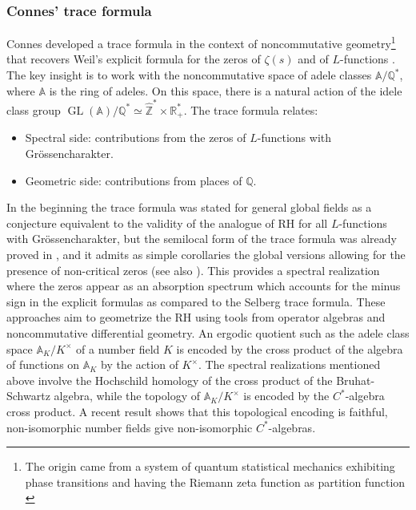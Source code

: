 \documentclass{article}
\def\A{{\mathbb A}}
\def\Q{{\mathbb Q}}
\def\R{{\mathbb R}}
\def\Z{{\mathbb Z}}
\begin{document}
\subsubsection{Connes' trace formula} Connes developed a trace formula in the context of noncommutative geometry\footnote{The origin came from  a system of quantum statistical mechanics exhibiting phase transitions and having the Riemann zeta function as partition function \cite{BC}} that recovers Weil's explicit formula for the zeros of $\zeta(s)$ and of $L$-functions \cite{Co-zeta, CMbook}. The key insight is to work with the noncommutative space of adele classes $\mathbb{A}/\mathbb{Q}^*$, where $\mathbb{A}$ is the ring of adeles. On this space, there is a natural action of the idele class group $\operatorname{GL}(\mathbb{A})/\mathbb{Q}^*\simeq \hat\Z^*\times \R_+^*$. The trace formula relates:
    \begin{itemize}
        \item Spectral side: contributions from the zeros of $L$-functions with Grössencharakter.
        \item Geometric side: contributions from places of $\Q$.
    \end{itemize}
    In the  beginning the trace formula was stated for general global fields as a conjecture equivalent to the validity of the analogue of RH for all $L$-functions with Grössencharakter, but the semilocal form of the trace formula was already proved in \cite{Co-zeta}, and it admits as simple corollaries the global versions allowing for the presence of non-critical zeros \cite{Meyer} (see also \cite{CMbook}). 
    This provides a spectral realization where the zeros appear as an absorption spectrum which accounts for the minus sign in the explicit formulas as compared to the Selberg trace formula. \newline
    These approaches aim to geometrize the RH using tools from operator algebras and noncommutative differential geometry. 
   An ergodic quotient such as the adele class space $\A_K/K^\times$ of a number field $K$ is encoded by the cross product of the algebra of functions on $\A_K$ by the action of $K^\times$. The spectral realizations mentioned above involve the Hochschild homology of the cross product of the Bruhat-Schwartz algebra, while the topology of $\A_K/K^\times$ is encoded by the $C^*$-algebra cross product. A recent result \cite{Bruce} shows that this topological encoding is faithful, non-isomorphic number fields give non-isomorphic $C^*$-algebras.
\end{document}

